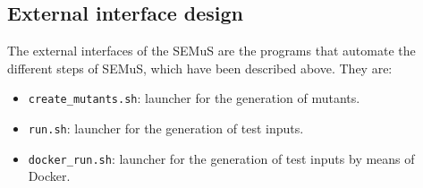 \subsection{External interface design}

The external interfaces of the SEMuS are the programs that automate the different steps of SEMuS, which have been described above. They are:

\begin{itemize}
  \item \texttt{create\_mutants.sh}: launcher for the generation of mutants.
  \item \texttt{run.sh}: launcher for the generation of test inputs.
  \item \texttt{docker\_run.sh}: launcher for the generation of test inputs by means of Docker.
\end{itemize}







